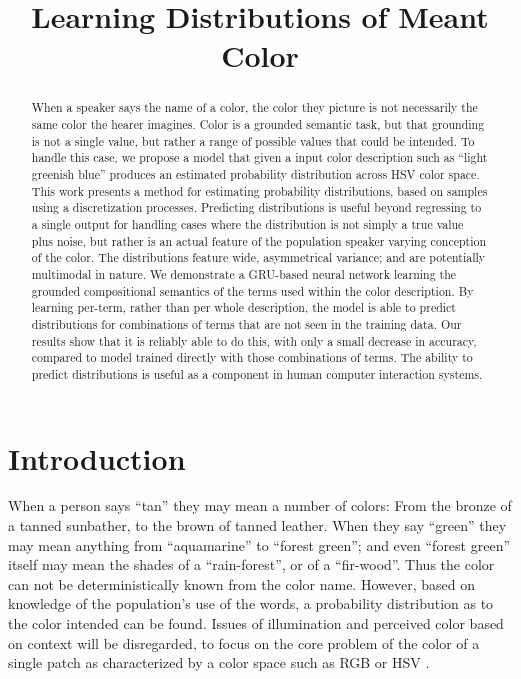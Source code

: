 \documentclass[11pt,letterpaper]{article}
\title{Learning Distributions of Meant Color}
\author{}
\date{}
\newcommand{\parencite}{\cite}
\begin{document}
\maketitle

\begin{abstract}
When a speaker says the name of a color, the color they picture is not necessarily the same color the hearer imagines.
Color is a grounded semantic task, but that grounding is not a single value, but rather a range of possible values that could be intended.
To handle this case, we propose a model that given a input color description such as ``light greenish blue'' produces an estimated probability distribution across HSV color space.
This work presents a method for estimating probability distributions, based on samples using a discretization processes.
Predicting distributions  is useful beyond regressing to a single output for handling cases where the distribution is not simply a true value plus noise, but rather is an actual feature of the population speaker varying conception of the color.
The distributions feature wide, asymmetrical variance; and are potentially multimodal in nature.
We demonstrate a GRU-based neural network learning the grounded compositional semantics of the terms used within the color description.
By learning per-term, rather than per whole description, the model is able to predict distributions for combinations of terms that are not seen in the training data.
Our results show that it is reliably able to do this,
with only a small decrease in accuracy, compared to model trained directly with those combinations of terms.
The ability to predict distributions is useful as a component in human computer interaction systems.


\end{abstract}

\section{Introduction}
When a person says ``tan'' they may mean a number of colors: From the bronze of a tanned sunbather, to the brown of tanned leather.
When they say ``green'' they may mean anything from ``aquamarine'' to ``forest green'';
 and even ``forest green'' itself may mean the shades of a ``rain-forest'', or of a ``fir-wood''.
Thus the color can not be deterministically known from the color name.
However, based on knowledge of the population's use of the words, a probability distribution as to the color intended can be found.
Issues of illumination and perceived color based on context will be disregarded, to focus on the core problem of the color of a single patch as characterized by a color space such as RGB or HSV \parencite{smith1978color}.
\end{document}
